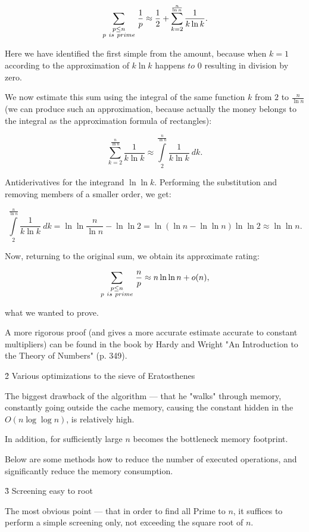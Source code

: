 $$ \sum_{ \scriptstyle p \le n \atop\scriptstyle p~is~prime } \frac{1}{p} \approx \frac{1}{2} + \sum_{k=2}^{\frac{n}{\ln n}} \frac{1}{k \ln k}. $$

Here we have identified the first simple from the amount, because when $k = 1$ according to the approximation of $k \ln k$ happens $to$ 0 resulting in division by zero.

We now estimate this sum using the integral of the same function $k$ from $2$ to $\frac{n}{\ln n}$ (we can produce such an approximation, because actually the money belongs to the integral as the approximation formula of rectangles):

$$ \sum_{k=2}^{\frac{n}{\ln n}} \frac{1}{k \ln k} \approx \int\limits_2^{\frac{n}{\ln n}} \frac{1}{k \ln k}\ dk. $$

Antiderivatives for the integrand $\ln \ln k$. Performing the substitution and removing members of a smaller order, we get:

$$ \int\limits_2^{\frac{n}{\ln n}} \frac{1}{k \ln k}\ dk = \ln \ln \frac{n}{\ln n} - \ln \ln 2 = \ln (\ln n - \ln \ln n) \ln \ln 2 \approx \ln \ln n. $$

Now, returning to the original sum, we obtain its approximate rating:

$$ \sum_{ \scriptstyle p \le n \atop\scriptstyle p~is~prime } \frac{n}{p} \approx n \ln \ln n + o(n), $$

what we wanted to prove.

A more rigorous proof (and gives a more accurate estimate accurate to constant multipliers) can be found in the book by Hardy and Wright "An Introduction to the Theory of Numbers" (p. 349).


\h2{ Various optimizations to the sieve of Eratosthenes }

The biggest drawback of the algorithm --- that he "walks" through memory, constantly going outside the cache memory, causing the constant hidden in the $O (n \log \log n)$, is relatively high.

In addition, for sufficiently large $n$ becomes the bottleneck memory footprint.

Below are some methods how to reduce the number of executed operations, and significantly reduce the memory consumption.


\h3{ Screening easy to root }

The most obvious point --- that in order to find all Prime to $n$, it suffices to perform a simple screening only, not exceeding the square root of $n$.

